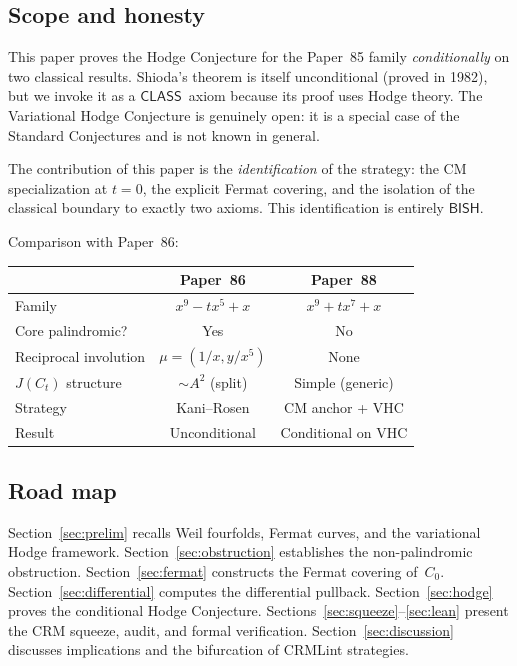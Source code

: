 \documentclass[11pt]{article}
\theoremstyle{plain}
\theoremstyle{definition}
\theoremstyle{remark}
\newcommand{\BISH}{\ensuremath{\mathsf{BISH}}}
\newcommand{\CLASS}{\ensuremath{\mathsf{CLASS}}}
\begin{document}
\subsection{Scope and honesty}

This paper proves the Hodge Conjecture for the Paper~85 family
\emph{conditionally} on two classical results.  Shioda's theorem
is itself unconditional (proved in 1982), but we invoke it as
a \CLASS\ axiom because its proof uses Hodge theory.  The
Variational Hodge Conjecture is genuinely open: it is a special
case of the Standard Conjectures and is not known in general.

The contribution of this paper is the \emph{identification} of the
strategy: the CM specialization at $t = 0$, the explicit Fermat
covering, and the isolation of the classical boundary to exactly
two axioms.  This identification is entirely \BISH.

Comparison with Paper~86:
\begin{center}
\begin{tabular}{lcc}
\toprule
& \textbf{Paper~86} & \textbf{Paper~88} \\
\midrule
Family & $x^9 - tx^5 + x$ & $x^9 + tx^7 + x$ \\
Core palindromic? & Yes & No \\
Reciprocal involution & $\mu = (1/x, y/x^5)$ & None \\
$J(C_t)$ structure & $\sim A^2$ (split) & Simple (generic) \\
Strategy & Kani--Rosen & CM anchor + VHC \\
Result & Unconditional & Conditional on VHC \\
\bottomrule
\end{tabular}
\end{center}

\subsection{Road map}

Section~\ref{sec:prelim} recalls Weil fourfolds, Fermat curves,
and the variational Hodge framework.
Section~\ref{sec:obstruction} establishes the non-palindromic
obstruction.
Section~\ref{sec:fermat} constructs the Fermat covering of~$C_0$.
Section~\ref{sec:differential} computes the differential pullback.
Section~\ref{sec:hodge} proves the conditional Hodge Conjecture.
Sections~\ref{sec:squeeze}--\ref{sec:lean} present the CRM
squeeze, audit, and formal verification.
Section~\ref{sec:discussion} discusses implications and the
bifurcation of CRMLint strategies.
\end{document}
